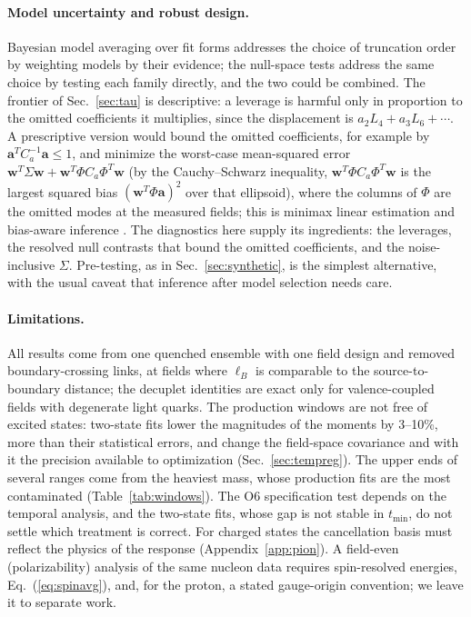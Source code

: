 \documentclass[aps,prd,reprint,twocolumn,superscriptaddress,nofootinbib,longbibliography]{revtex4-2}
\begin{document}
\paragraph{Model uncertainty and robust design.} Bayesian model averaging over fit forms \cite{JayNeil2021} addresses the choice of truncation order by weighting models by their evidence; the null-space tests address the same choice by testing each family directly, and the two could be combined. The frontier of Sec.~\ref{sec:tau} is descriptive: a leverage is harmful only in proportion to the omitted coefficients it multiplies, since the displacement is $a_2L_4+a_3L_6+\cdots$. A prescriptive version would bound the omitted coefficients, for example by $\bm a^TC_a^{-1}\bm a\le1$, and minimize the worst-case mean-squared error $\bm w^T\Sigma\bm w+\bm w^T\Phi C_a\Phi^T\bm w$ (by the Cauchy--Schwarz inequality, $\bm w^T\Phi C_a\Phi^T\bm w$ is the largest squared bias $(\bm w^T\Phi\bm a)^2$ over that ellipsoid), where the columns of $\Phi$ are the omitted modes at the measured fields; this is minimax linear estimation \cite{Donoho1994} and bias-aware inference \cite{ArmstrongKolesar2018}. The diagnostics here supply its ingredients: the leverages, the resolved null contrasts that bound the omitted coefficients, and the noise-inclusive $\Sigma$. Pre-testing, as in Sec.~\ref{sec:synthetic}, is the simplest alternative, with the usual caveat that inference after model selection needs care.

\paragraph{Limitations.} All results come from one quenched ensemble with one field design and removed boundary-crossing links, at fields where $\ell_B$ is comparable to the source-to-boundary distance; the decuplet identities are exact only for valence-coupled fields with degenerate light quarks. The production windows are not free of excited states: two-state fits lower the magnitudes of the moments by 3--10\%, more than their statistical errors, and change the field-space covariance and with it the precision available to optimization (Sec.~\ref{sec:tempreg}). The upper ends of several ranges come from the heaviest mass, whose production fits are the most contaminated (Table~\ref{tab:windows}). The O6 specification test depends on the temporal analysis, and the two-state fits, whose gap is not stable in $t_{\min}$, do not settle which treatment is correct. For charged states the cancellation basis must reflect the physics of the response (Appendix~\ref{app:pion}). A field-even (polarizability) analysis of the same nucleon data requires spin-resolved energies, Eq.~(\ref{eq:spinavg}), and, for the proton, a stated gauge-origin convention; we leave it to separate work.
\end{document}
